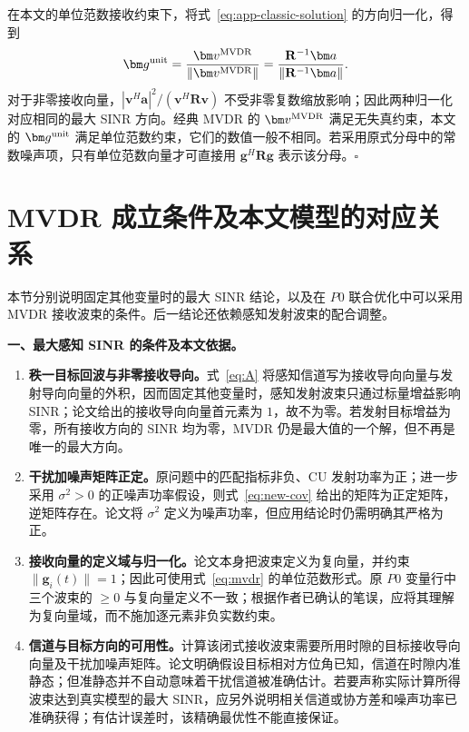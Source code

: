 在本文的单位范数接收约束下，将式~\eqref{eq:app-classic-solution} 的方向归一化，得到
\begin{equation}\label{eq:app-unit-norm}
\bm g^{\rm unit}=\frac{\bm v^{\rm MVDR}}{\|\bm v^{\rm MVDR}\|}
=\frac{\mathbf R^{-1}\bm a}{\|\mathbf R^{-1}\bm a\|}.
\end{equation}
对于非零接收向量，$|\bm v^H\bm a|^2/(\bm v^H\mathbf R\bm v)$ 不受非零复数缩放影响；因此两种归一化对应相同的最大 SINR 方向。经典 MVDR 的 $\bm v^{\rm MVDR}$ 满足无失真约束，本文的 $\bm g^{\rm unit}$ 满足单位范数约束，它们的数值一般不相同。若采用原式分母中的常数噪声项，只有单位范数向量才可直接用 $\bm g^H\mathbf R\bm g$ 表示该分母。\hfill$\square$

\section{MVDR 成立条件及本文模型的对应关系}\label{app:conditions}
本节分别说明固定其他变量时的最大 SINR 结论，以及在 $P0$ 联合优化中可以采用 MVDR 接收波束的条件。后一结论还依赖感知发射波束的配合调整。

\noindent\textbf{一、最大感知 SINR 的条件及本文依据。}
\begin{enumerate}[label=\textbf{(\arabic*)},leftmargin=*]
\item \textbf{秩一目标回波与非零接收导向。}式~\eqref{eq:A} 将感知信道写为接收导向向量与发射导向向量的外积，因而固定其他变量时，感知发射波束只通过标量增益影响 SINR；论文给出的接收导向向量首元素为 $1$，故不为零。若发射目标增益为零，所有接收方向的 SINR 均为零，MVDR 仍是最大值的一个解，但不再是唯一的最大方向。
\item \textbf{干扰加噪声矩阵正定。}原问题中的匹配指标非负、CU 发射功率为正；进一步采用 $\sigma^2>0$ 的正噪声功率假设，则式~\eqref{eq:new-cov} 给出的矩阵为正定矩阵，逆矩阵存在。论文将 $\sigma^2$ 定义为噪声功率，但应用结论时仍需明确其严格为正。
\item \textbf{接收向量的定义域与归一化。}论文本身把波束定义为复向量，并约束 $\|\bm g_i(t)\|=1$；因此可使用式~\eqref{eq:mvdr} 的单位范数形式。原 $P0$ 变量行中三个波束的 $\ge0$ 与复向量定义不一致；根据作者已确认的笔误，应将其理解为复向量域，而不施加逐元素非负实数约束。
\item \textbf{信道与目标方向的可用性。}计算该闭式接收波束需要所用时隙的目标接收导向向量及干扰加噪声矩阵。论文明确假设目标相对方位角已知，信道在时隙内准静态；但准静态并不自动意味着干扰信道被准确估计。若要声称实际计算所得波束达到真实模型的最大 SINR，应另外说明相关信道或协方差和噪声功率已准确获得；有估计误差时，该精确最优性不能直接保证。
\end{enumerate}


